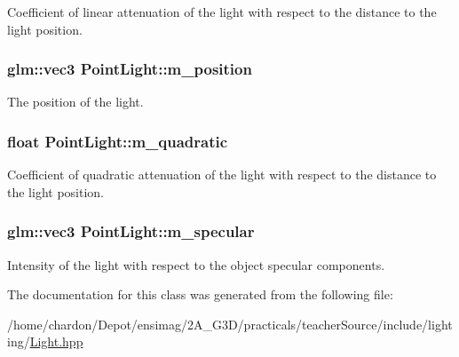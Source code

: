 Coefficient of linear attenuation of the light with respect to the distance to the light position. \hypertarget{classPointLight_a58baecb4dd64a4dc3ea59628f55cbac4}{
\subsubsection[{m\+\_\+position}]{\setlength{\rightskip}{0pt plus 5cm}glm\+::vec3 Point\+Light\+::m\+\_\+position\hspace{0.3cm}{\ttfamily [private]}}}\label{classPointLight_a58baecb4dd64a4dc3ea59628f55cbac4}
The position of the light. \hypertarget{classPointLight_a4cc1b2791d8e3ca503060f6f1f38f774}{
\subsubsection[{m\+\_\+quadratic}]{\setlength{\rightskip}{0pt plus 5cm}float Point\+Light\+::m\+\_\+quadratic\hspace{0.3cm}{\ttfamily [private]}}}\label{classPointLight_a4cc1b2791d8e3ca503060f6f1f38f774}
Coefficient of quadratic attenuation of the light with respect to the distance to the light position. \hypertarget{classPointLight_a07a85987190c6c415b93437554f1f0f1}{
\subsubsection[{m\+\_\+specular}]{\setlength{\rightskip}{0pt plus 5cm}glm\+::vec3 Point\+Light\+::m\+\_\+specular\hspace{0.3cm}{\ttfamily [private]}}}\label{classPointLight_a07a85987190c6c415b93437554f1f0f1}
Intensity of the light with respect to the object specular components. 

The documentation for this class was generated from the following file\+:\begin{DoxyCompactItemize}
\item 
/home/chardon/\+Depot/ensimag/2\+A\+\_\+\+G3\+D/practicals/teacher\+Source/include/lighting/\hyperlink{Light_8hpp}{Light.\+hpp}\end{DoxyCompactItemize}
